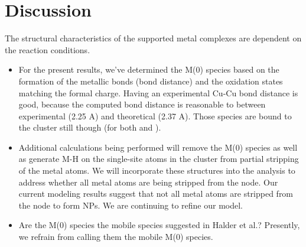 \documentclass[12pt]{article}
\begin{document}
\newpage

\section{Discussion}
The structural characteristics of the supported metal complexes are dependent on the reaction conditions.
\begin{itemize}
    \item For the present results, we've determined the M(0) species based on the formation of the metallic bonds (bond distance) and the oxidation states matching the formal charge. Having an experimental Cu-Cu bond distance is good, because the computed bond distance is reasonable to between experimental (2.25 A) and theoretical (2.37 A). Those species are bound to the cluster still though (for both  and ). 
    \item Additional calculations being performed will remove the M(0) species as well as generate M-H on the single-site atoms in the cluster from partial stripping of the metal atoms. We will incorporate these structures into the analysis to address whether all metal atoms are being stripped from the node. Our current modeling results suggest that not all metal atoms are stripped from the node to form NPs. We are continuing to refine our model. 
    \item Are the M(0) species the mobile species suggested in Halder et al.? Presently, we refrain from calling them the mobile M(0) species. 
\end{itemize}

\newpage
\end{document}
